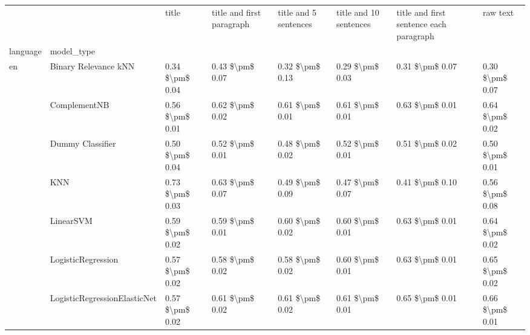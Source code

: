 \begin{tabular}{llllllll}
\toprule
   &         &                title & title and first paragraph & title and 5 sentences & title and 10 sentences & title and first sentence each paragraph &             raw text \\
language & model\_type &                      &                           &                       &                        &                                         &                      \\
\midrule
en & Binary Relevance kNN &      0.34 \$\textbackslash pm\$ 0.04 &           0.43 \$\textbackslash pm\$ 0.07 &       0.32 \$\textbackslash pm\$ 0.13 &        0.29 \$\textbackslash pm\$ 0.03 &                         0.31 \$\textbackslash pm\$ 0.07 &      0.30 \$\textbackslash pm\$ 0.07 \\
   & ComplementNB &      0.56 \$\textbackslash pm\$ 0.01 &           0.62 \$\textbackslash pm\$ 0.02 &       0.61 \$\textbackslash pm\$ 0.01 &        0.61 \$\textbackslash pm\$ 0.01 &                         0.63 \$\textbackslash pm\$ 0.01 &      0.64 \$\textbackslash pm\$ 0.02 \\
   & Dummy Classifier &      0.50 \$\textbackslash pm\$ 0.04 &           0.52 \$\textbackslash pm\$ 0.01 &       0.48 \$\textbackslash pm\$ 0.02 &        0.52 \$\textbackslash pm\$ 0.01 &                         0.51 \$\textbackslash pm\$ 0.02 &      0.50 \$\textbackslash pm\$ 0.01 \\
   & KNN &      0.73 \$\textbackslash pm\$ 0.03 &           0.63 \$\textbackslash pm\$ 0.07 &       0.49 \$\textbackslash pm\$ 0.09 &        0.47 \$\textbackslash pm\$ 0.07 &                         0.41 \$\textbackslash pm\$ 0.10 &      0.56 \$\textbackslash pm\$ 0.08 \\
   & LinearSVM &      0.59 \$\textbackslash pm\$ 0.02 &           0.59 \$\textbackslash pm\$ 0.01 &       0.60 \$\textbackslash pm\$ 0.02 &        0.60 \$\textbackslash pm\$ 0.01 &                         0.63 \$\textbackslash pm\$ 0.01 &      0.64 \$\textbackslash pm\$ 0.02 \\
   & LogisticRegression &      0.57 \$\textbackslash pm\$ 0.02 &           0.58 \$\textbackslash pm\$ 0.02 &       0.58 \$\textbackslash pm\$ 0.02 &        0.60 \$\textbackslash pm\$ 0.01 &                         0.63 \$\textbackslash pm\$ 0.01 &      0.65 \$\textbackslash pm\$ 0.02 \\
   & LogisticRegressionElasticNet &      0.57 \$\textbackslash pm\$ 0.02 &           0.61 \$\textbackslash pm\$ 0.02 &       0.61 \$\textbackslash pm\$ 0.02 &        0.61 \$\textbackslash pm\$ 0.01 &                         0.65 \$\textbackslash pm\$ 0.01 &      0.66 \$\textbackslash pm\$ 0.01 \\

\end{tabular}
